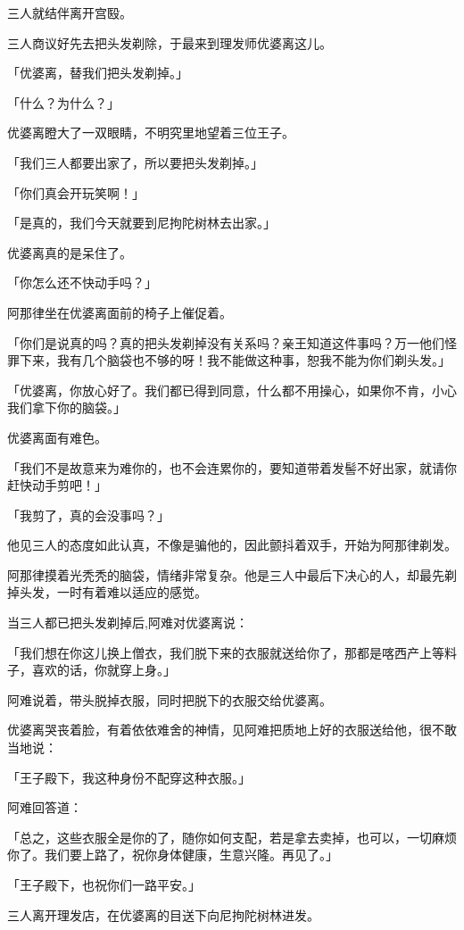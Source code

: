\documentclass[twoside,openany]{book}
\begin{document}
三人就结伴离开宫殹。

三人商议好先去把头发剃除，于最来到理发师优婆离这儿。

「优婆离，替我们把头发剃掉。」

「什么？为什么？」

优婆离瞪大了一双眼睛，不明究里地望着三位王子。

「我们三人都要出家了，所以要把头发剃掉。」

「你们真会开玩笑啊！」

「是真的，我们今天就要到尼拘陀树林去出家。」

优婆离真的是呆住了。

「你怎么还不快动手吗？」

阿那律坐在优婆离面前的椅子上催促着。

「你们是说真的吗？真的把头发剃掉没有关系吗？亲王知道这件事吗？万一他们怪罪下来，我有几个脑袋也不够的呀！我不能做这种事，恕我不能为你们剃头发。」

「优婆离，你放心好了。我们都已得到同意，什么都不用操心，如果你不肯，小心我们拿下你的脑袋。」

优婆离面有难色。

「我们不是故意来为难你的，也不会连累你的，要知道带着发髻不好出家，就请你赶快动手剪吧！」

「我剪了，真的会没事吗？」

他见三人的态度如此认真，不像是骗他的，因此颤抖着双手，开始为阿那律剃发。

阿那律摸着光秃秃的脑袋，情绪非常复杂。他是三人中最后下决心的人，却最先剃掉头发，一时有着难以适应的感觉。

当三人都已把头发剃掉后,阿难对优婆离说：

「我们想在你这儿换上僧衣，我们脱下来的衣服就送给你了，那都是喀西产上等料子，喜欢的话，你就穿上身。」

阿难说着，带头脱掉衣服，同时把脱下的衣服交给优婆离。

优婆离哭丧着脸，有着依依难舍的神情，见阿难把质地上好的衣服送给他，很不敢当地说：

「王子殿下，我这种身份不配穿这种衣服。」

阿难回答道：

「总之，这些衣服全是你的了，随你如何支配，若是拿去卖掉，也可以，一切麻烦你了。我们要上路了，祝你身体健康，生意兴隆。再见了。」

「王子殿下，也祝你们一路平安。」

三人离开理发店，在优婆离的目送下向尼拘陀树林进发。
\end{document}
